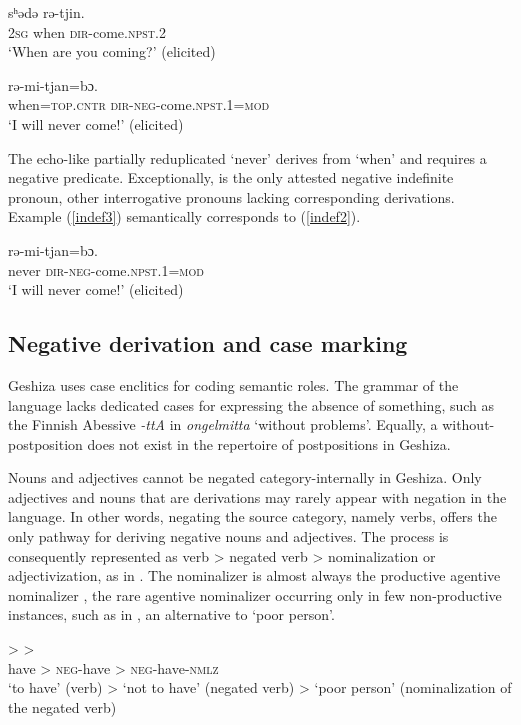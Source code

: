 \documentclass[output=paper,colorlinks,citecolor=brown]{langscibook}
\begin{document}
\ea
\label{indef1}
	{sʰədə} 	{rə-tjin}.\\ 
        \textsc{2sg} when    \textsc{dir}-come.\textsc{npst}.2\\
\glt `When are you coming?' (elicited)
\z

\ea
\label{indef2}
 	{rə-mi-tjan=bɔ}.\\ 
        when=\textsc{top.cntr}    \textsc{dir-neg}-come.\textsc{npst}.1=\textsc{mod}\\
\glt `I will never come!' (elicited)
\z

\noindent
The echo-like partially reduplicated  `never' derives from  `when'  and requires a negative predicate. Exceptionally,  is the only attested negative indefinite pronoun, other interrogative pronouns lacking corresponding derivations. Example (\ref{indef3}) semantically corresponds to (\ref{indef2}).


\ea
\label{indef3}
 	{rə-mi-tjan=bɔ}.\\ 
        never    \textsc{dir-neg}-come.\textsc{npst}.1=\textsc{mod}\\
\glt `I will never come!' (elicited)
\z

\subsection{Negative derivation and case marking}
Geshiza uses case enclitics for coding semantic roles. The grammar of the language lacks dedicated cases for expressing the absence of something, such as the Finnish Abessive \textit{-ttA} in \textit{ongelmitta} `without problems'. Equally, a without-postposition does not exist in the repertoire of postpositions in Geshiza.

Nouns and adjectives cannot be negated category-internally in Geshiza. Only adjectives and nouns that are derivations may rarely appear with negation in the language. In other words, negating the source category, namely verbs, offers the only pathway for deriving negative nouns and adjectives. The process is consequently represented as verb > negated verb > nominalization or adjectivization, as in . The nominalizer is almost always the productive agentive nominalizer , the rare agentive nominalizer  occurring only in few non-productive instances, such as in , an alternative to  `poor person'. 

\ea
\label{negandderivation}
\gll  {} >   > \\ 
have  > \textsc{neg}-have  > \textsc{neg}-have-\textsc{nmlz}\\
\glt `to have’ (verb) > `not to have' (negated verb) > `poor person' (nominalization of the negated verb)
\z
\end{document}
